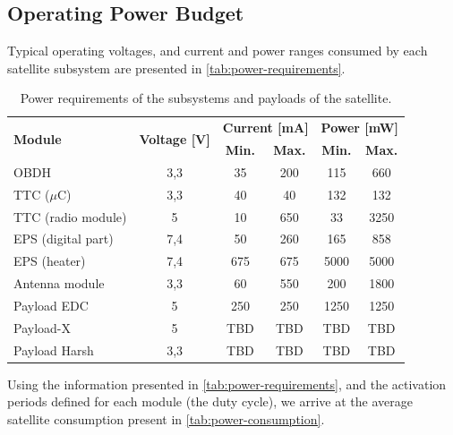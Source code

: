\subsection{Operating Power Budget}

Typical operating voltages, and current and power ranges consumed by each satellite subsystem are presented in \autoref{tab:power-requirements}.

\begin{table}[!h]
    \centering
    \begin{tabular}{lccccc}
        \toprule[1.5pt]
        \multirow{2}{*}{\textbf{Module}} & \multirow{2}{*}{\textbf{Voltage [V]}}    & \multicolumn{2}{c}{\textbf{Current [mA]}} & \multicolumn{2}{c}{\textbf{Power [mW]}} \\
                                         &                                          & \textbf{Min.} & \textbf{Max.}             & \textbf{Min.} & \textbf{Max.} \\
        \midrule
        OBDH                & 3,3   & 35    & 200   & 115   & 660 \\
        TTC ($\mu$C)        & 3,3   & 40    & 40    & 132   & 132 \\
        TTC (radio module)  & 5     & 10    & 650   & 33    & 3250 \\
        EPS (digital part)  & 7,4   & 50    & 260   & 165   & 858 \\
        EPS (heater)        & 7,4   & 675   & 675   & 5000  & 5000 \\
        Antenna module      & 3,3   & 60    & 550   & 200   & 1800 \\
        Payload EDC         & 5     & 250   & 250   & 1250  & 1250 \\
        Payload-X           & 5     & TBD   & TBD   & TBD   & TBD \\
        Payload Harsh       & 3,3   & TBD   & TBD   & TBD   & TBD \\
        \bottomrule[1.5pt]
    \end{tabular}
    \caption{Power requirements of the subsystems and payloads of the satellite.}
    \label{tab:power-requirements}
\end{table}

Using the information presented in \autoref{tab:power-requirements}, and the activation periods defined for each module (the duty cycle), we arrive at the average satellite consumption present in \autoref{tab:power-consumption}.

